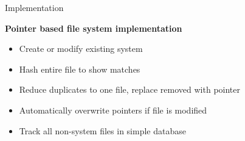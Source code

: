 \begin{frame}[t]{Implementation}

  \hspace*{.6in}
  \begin{minipage}{3.5in}
  \begin{center}

	\vspace*{.3in}
	\textbf{Pointer based file system implementation}
	\begin{itemize}
	\renewcommand{\labelitemi}{$\bullet$}
		\item Create or modify existing system
		\item Hash entire file to show matches
		\item Reduce duplicates to one file, replace removed with pointer
		\item Automatically overwrite pointers if file is modified
		\item Track all non-system files in simple database
	\end{itemize}	  

  \end{center}
  \end{minipage}

\end{frame}